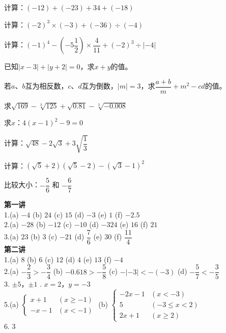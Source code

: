 \documentclass[a4paper,12pt]{ctexart}
\begin{document}
\begin{exercise}
\item 计算：$(-12)+(-23)+34+(-18)$
\item 计算：$(-2)^3\times(-3)+(-36)\div(-4)$
\item 计算：$(-1)^4-(-5\dfrac{1}{2})\times\dfrac{4}{11}+(-2)^3\div|-4|$
\item 已知$|x-3|+|y+2|=0$，求$x+y$的值。
\item 若$a$、$b$互为相反数，$c$、$d$互为倒数，$|m|=3$，求$\dfrac{a+b}{m}+m^2-cd$的值。
\item 求$\sqrt{169}-\sqrt[3]{125}+\sqrt{0.81}-\sqrt[3]{-0.008}$
\item 求$x$：$4(x-1)^2-9=0$
\item 计算：$\sqrt{48}-2\sqrt{3}+3\sqrt{\dfrac{1}{3}}$
\item 计算：$(\sqrt{5}+2)(\sqrt{5}-2)-(\sqrt{3}-1)^2$
\item 比较大小：$-\dfrac{5}{6}$ 和 $-\dfrac{6}{7}$
\end{exercise}

\newpage


\textbf{第一讲}
\noindent\\
1.(a) $-4$ \quad (b) $24$ \quad (c) $15$ \quad (d) $-3$ \quad (e) $1$ \quad (f) $-2.5$\\
2.(a) $-28$ \quad (b) $-12$ \quad (c) $-10$ \quad (d) $-324$ \quad (e) $16$ \quad (f) $21$\\
3.(a) $23$ \quad (b) $3$ \quad (c) $-21$ \quad (d) $\dfrac{7}{6}$ \quad (e) $30$ \quad (f) $\dfrac{11}{4}$\\

\textbf{第二讲}
\noindent\\
1.(a) $8$ \quad (b) $6$ \quad (c) $12$ \quad (d) $4$ \quad (e) $13$ \quad (f) $-4$\\
2.(a) $-\dfrac{2}{3}>-\dfrac{3}{4}$ \quad (b) $-0.618>-\dfrac{5}{8}$ \quad (c) $-|{-3}|<-(-3)$ \quad (d) $-\dfrac{5}{7}<-\dfrac{3}{5}$\\
3. $\pm5$，$\pm1$ . $x=2$，$y=-3$\\
5.(a) $\begin{cases}x+1&(x\ge-1)\\-x-1&(x<-1)\end{cases}$ \quad (b) $\begin{cases}-2x-1&(x<-3)\\5&(-3\le x<2)\\2x+1&(x\ge2)\end{cases}$\\
6. $3$\\
\end{document}
